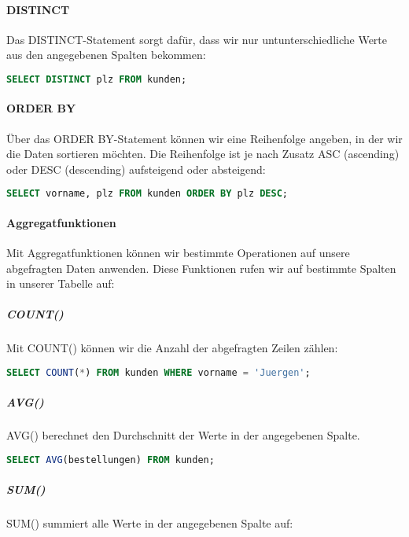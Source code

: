 \documentclass{article}
\begin{document}
	\paragraph{DISTINCT}
	Das DISTINCT-Statement sorgt dafür, dass wir nur untunterschiedliche Werte aus den angegebenen Spalten bekommen:

	\begin{lstlisting}[language=SQL, caption=Postleitzahlen aller Orte mit registrierten Kunden]
	SELECT DISTINCT plz FROM kunden;
	\end{lstlisting}

	\paragraph{ORDER BY}
	Über das ORDER BY-Statement können wir eine Reihenfolge angeben, in der wir die Daten sortieren möchten. Die Reihenfolge ist je nach Zusatz ASC (ascending) oder DESC (descending) aufsteigend oder absteigend:

	\begin{lstlisting}[language=SQL, caption=Vorname und PLZ aller Kunden absteigend sortiert anhand der PLZ]
	SELECT vorname, plz FROM kunden ORDER BY plz DESC;
	\end{lstlisting}

	\paragraph{Aggregatfunktionen}
	Mit Aggregatfunktionen können wir bestimmte Operationen auf unsere abgefragten Daten anwenden. Diese Funktionen rufen wir auf bestimmte Spalten in unserer Tabelle auf:

	\subparagraph{COUNT()}
	Mit COUNT() können wir die Anzahl der abgefragten Zeilen zählen:

	\begin{lstlisting}[language=SQL, caption=Anzahl aller Kunden mit dem Vornamen "Jürgen"]
	SELECT COUNT(*) FROM kunden WHERE vorname = 'Juergen';
	\end{lstlisting}

	\subparagraph{AVG()}
	AVG() berechnet den Durchschnitt der Werte in der angegebenen Spalte.

	\begin{lstlisting}[language=SQL, caption=Durchschnittliche Bestellungen eines Kunden]
	SELECT AVG(bestellungen) FROM kunden;
	\end{lstlisting}

	\subparagraph{SUM()}
	SUM() summiert alle Werte in der angegebenen Spalte auf:
\end{document}
